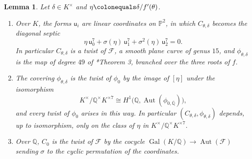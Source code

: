 \documentclass[12pt]{amsart}
\newcommand{\PP}{{\mathbb P}}
\newcommand{\Q}{\mathbb{Q}}
\newcommand{\Qbar}{{\overline{\Q}}}
\newcommand{\calF}{{\mathcal F}}
\newcommand{\sfu}{\mathsf{u}}
\DeclareMathOperator{\Aut}{Aut}
\DeclareMathOperator{\Gal}{Gal}
\numberwithin{equation}{section}
\newtheorem{lemma}[theorem]{Lemma}
\theoremstyle{definition}
\begin{document}
\begin{lemma}
  \label{lem:fermat-twist}
  Let $\delta \in K^{\times}$ and $\eta \colonequals \delta/f'(\theta)$.
  \begin{enumerate}
  \item \label{item:diagonal} Over $K$, the forms $\sfu_i$ are
    linear coordinates on $\PP^{2}$, in which $C_{\theta,\delta}$
    becomes the diagonal septic
    \begin{equation}
      \label{eq:fermat-twist}
      \eta\,\sfu_0^{7} + \sigma(\eta)\,\sfu_1^{7} + \sigma^{2}(\eta)\,\sfu_2^{7} = 0 .
    \end{equation}
    In particular $C_{\theta,\delta}$ is a twist of $\calF$, a smooth plane
    curve of genus $15$, and $\phi_{\theta,\delta}$ is the map of degree $49$ of
    \cite{Bruin06-nn2}*{Theorem 3}, branched over the three roots of $f$.
  \item \label{item:twist-class} The covering $\phi_{\theta,\delta}$ is the twist of $\phi_0$
    by the image of $[\eta]$ under the isomorphism
    \[
      K^{\times}/\Q^{\times}K^{\times 7} \cong H^1\bigl(\Q,\Aut(\phi_{0,\Qbar})\bigr),
    \]
    and every twist of $\phi_0$ arises in this way. In particular
    $(C_{\theta,\delta},\phi_{\theta,\delta})$ depends, up to isomorphism, only on
    the class of $\eta$ in $K^{\times}/\Q^{\times}K^{\times 7}$.
  \item \label{item:C0} Over $\Q$, $C_0$ is the twist of $\calF$ by the cocycle
    $\Gal(K/\Q) \to \Aut(\calF)$ sending $\sigma$ to the cyclic permutation of
    the coordinates.
  \end{enumerate}
\end{lemma}
\end{document}
